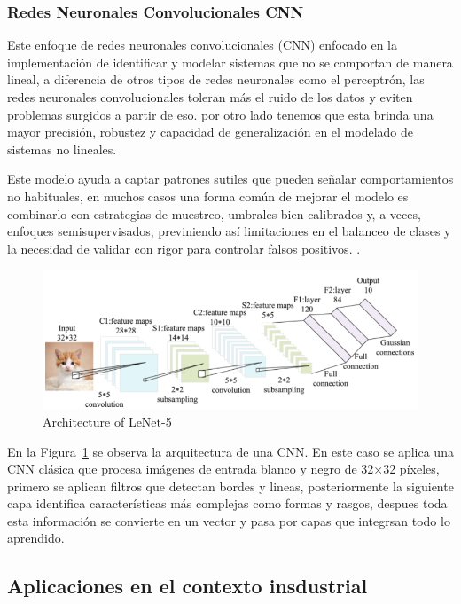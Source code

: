 \documentclass[11pt,a4paper,spanish]{book}
\numberwithin{equation}{chapter}
\numberwithin{figure}{chapter}
\begin{document}
\subsubsection{Redes Neuronales Convolucionales CNN}


Este enfoque de redes neuronales convolucionales (CNN) enfocado en la implementación 
de identificar y modelar sistemas que no se comportan de manera lineal, a diferencia 
de otros tipos de redes neuronales como el perceptrón, las redes neuronales 
convolucionales toleran más el ruido de los datos y eviten problemas surgidos a 
partir de eso. por otro lado tenemos que esta brinda una mayor precisión, robustez y 
capacidad de generalización en el modelado de sistemas no lineales. 
\cite{LopezPacheco2017}


Este modelo ayuda a captar patrones sutiles que pueden señalar comportamientos no 
habituales, en muchos casos una forma común de mejorar el modelo es combinarlo con 
estrategias de muestreo, umbrales bien calibrados y, a veces, enfoques semisupervisados, 
previniendo así limitaciones en el balanceo de clases y la necesidad de validar con 
rigor para controlar falsos positivos. \cite{ameijeiras2021algoritmos}.


\begin{figure}[h]
    \centering
    \includegraphics[width=1.0\textwidth]{media/lenet-o5.png}
    \caption{Architecture of LeNet-5  \protect\cite{Zhao2024review}}
    \label{fig:figLenet}
\end{figure}


En la Figura~\ref{fig:figLenet} se observa la arquitectura de una CNN. En este caso se 
aplica una CNN clásica que procesa imágenes de entrada blanco y negro de 32×32 píxeles, 
primero se aplican filtros que detectan bordes y lineas, posteriormente la siguiente 
capa identifica características más complejas como formas y rasgos, despues toda esta 
información se convierte en un vector y pasa por capas que integrsan todo lo aprendido. 
\cite{Zhao2024review}


\subsection{Aplicaciones en el contexto insdustrial} 
\end{document}
